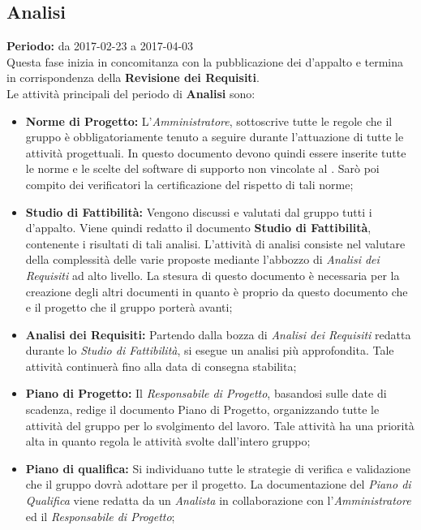	\subsection{Analisi}
	\textbf{Periodo:} da 2017-02-23 a 2017-04-03 \\
	Questa fase inizia in concomitanza con la pubblicazione dei  d'appalto e termina in 		 corrispondenza della \textbf{Revisione dei Requisiti}. \\
	Le attività principali del periodo di \textbf{Analisi} sono: \\
	\begin{itemize}
		\item \textbf{Norme di Progetto:} L'\textit{Amministratore}, sottoscrive tutte le regole che il gruppo è obbligatoriamente tenuto a seguire durante l'attuazione di tutte le attività progettuali. In questo documento devono quindi essere inserite tutte le norme e le scelte del software di supporto non vincolate al . Sarò poi compito dei verificatori la certificazione del rispetto di tali norme;
		\item \textbf{Studio di Fattibilità:} Vengono discussi e valutati dal gruppo tutti i  d'appalto. Viene quindi redatto il documento \textbf{Studio di Fattibilità}, contenente i risultati di tali analisi. L'attività di analisi consiste nel valutare della complessità delle varie proposte mediante l'abbozzo di \textit{Analisi dei Requisiti} ad alto livello. La stesura di questo documento è necessaria per la creazione degli altri documenti in quanto è proprio da questo documento che e il progetto che il gruppo porterà avanti;
		\item \textbf{Analisi dei Requisiti:} Partendo dalla bozza di \textit{Analisi dei Requisiti} redatta durante lo \textit{Studio di Fattibilità}, si esegue un analisi più approfondita. Tale attività continuerà fino alla data di consegna stabilita;
		\item \textbf{Piano di Progetto:} Il \textit{Responsabile di Progetto}, basandosi sulle date di scadenza, redige il documento Piano di Progetto, organizzando tutte le attività del gruppo per lo svolgimento del lavoro. Tale attività ha una priorità alta in quanto regola le attività svolte dall'intero gruppo;
		\item \textbf{Piano di qualifica:} Si individuano tutte le strategie di verifica e validazione che il gruppo dovrà adottare per il progetto. La documentazione del \textit{Piano di Qualifica} viene redatta da un \textit{Analista} in collaborazione con l'\textit{Amministratore} ed il \textit{Responsabile di Progetto};

\end{itemize}
